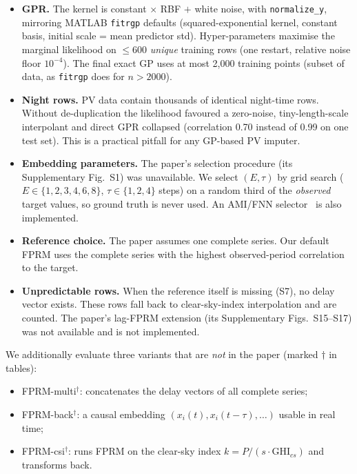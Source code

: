 \documentclass[11pt,a4paper]{article}
\begin{document}
\begin{itemize}
  \item \textbf{GPR.} The kernel is constant $\times$ RBF $+$ white noise, with \texttt{normalize\_y}, mirroring MATLAB \texttt{fitrgp} defaults (squared-exponential kernel, constant basis, initial scale = mean predictor std). Hyper-parameters maximise the marginal likelihood on $\le$600 \emph{unique} training rows (one restart, relative noise floor $10^{-4}$). The final exact GP uses at most 2{,}000 training points (subset of data, as \texttt{fitrgp} does for $n>2000$).
  \item \textbf{Night rows.} PV data contain thousands of identical night-time rows. Without de-duplication the likelihood favoured a zero-noise, tiny-length-scale interpolant and direct GPR collapsed (correlation 0.70 instead of 0.99 on one test set). This is a practical pitfall for any GP-based PV imputer.
  \item \textbf{Embedding parameters.} The paper's selection procedure (its Supplementary Fig.~S1) was unavailable. We select $(E,\tau)$ by grid search ($E\in\{1,2,3,4,6,8\}$, $\tau\in\{1,2,4\}$ steps) on a random third of the \emph{observed} target values, so ground truth is never used. An AMI/FNN selector~\cite{fraser1986,kennel1992} is also implemented.
  \item \textbf{Reference choice.} The paper assumes one complete series. Our default FPRM uses the complete series with the highest observed-period correlation to the target.
  \item \textbf{Unpredictable rows.} When the reference itself is missing (S7), no delay vector exists. These rows fall back to clear-sky-index interpolation and are counted. The paper's lag-FPRM extension (its Supplementary Figs.~S15--S17) was not available and is not implemented.
\end{itemize}

We additionally evaluate three variants that are \emph{not} in the paper (marked $\dagger$ in tables):
\begin{itemize}
  \item FPRM-multi$^\dagger$: concatenates the delay vectors of all complete series;
  \item FPRM-back$^\dagger$: a causal embedding $(x_i(t), x_i(t-\tau),\dots)$ usable in real time;
  \item FPRM-csi$^\dagger$: runs FPRM on the clear-sky index $k = P/(s\cdot\mathrm{GHI}_{cs})$ and transforms back.
\end{itemize}
\end{document}
